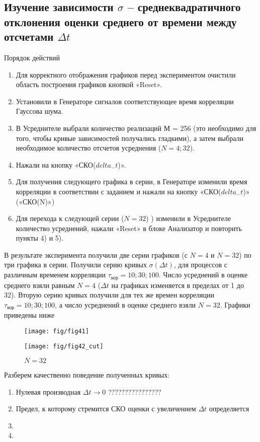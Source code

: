 \documentclass[a4paper,14pt]{extarticle}
\begin{document}
\subsection[Задание 4]{Изучение зависимости $\sigma$ -- среднеквадратичного отклонения оценки среднего от времени между отсчетами $\Delta t$}
Порядок действий
\begin{enumerate}
	\item Для корректного отображения графиков перед экспериментом очистили область построения графиков кнопкой «Reset».
	\item Установили в Генераторе сигналов соответствующее время корреляции Гауссова шума.
	\item В Усреднителе выбрали количество реализаций М = 256 (это необходимо для того, чтобы кривые зависимостей получались гладкими), а затем выбрали необходимое количество отсчетов усреднения ($N = 4; 32$).
	\item Нажали на кнопку «СКО($delta_{-}t$)».
	\item Для получения следующего графика в серии, в Генераторе изменили время корреляции в соответствии с заданием и
	нажали на кнопку «СКО($delta_{-}t$)» («СКО(N)»)
	\item Для перехода к следующей серии ($N=32$) ) изменили в Усреднителе количество усреднений, нажали «Reset» в блоке Анализатор и повторить пункты 4) и 5).
\end{enumerate}
В результате эксперимента получили две серии графиков (с $N = 4$ и $N = 32$) по три графика в серии.
Получили серию кривых $\sigma(\Delta t)$, для процессов с различным временем корреляции $\tau_\text{кор}= 10; 30; 100$. Число усреднений в оценке среднего взяли равным $N = 4$ ($\Delta t$ на графиках изменяется в пределах от 1 до 32).
Вторую серию кривых получили для тех же времен корреляции $\tau_\text{кор}= 10; 30; 100$, а число усреднений в оценке среднего взяли $N = 32$.
Графики приведены ниже
\begin{figure}[H]
	\centering
	\begin{minipage}{0.49\linewidth}
		\texttt{[image: fig/fig41]}
        \caption{$N = 4$}
	\end{minipage}
    \begin{minipage}{0.49\linewidth}
		\texttt{[image: fig/fig42\_cut]}
        \caption{$N = 32$}
	\end{minipage}

\end{figure}

Разберем качественно поведение полученных кривых: 
\begin{enumerate}
	\item Нулевая производная $\Delta t \to 0$ ????????????????
	\item Предел, к которому стремится СКО оценки с увеличением $\Delta t $ определяется 
	\item 
	\item 
\end{enumerate}
\end{document}

